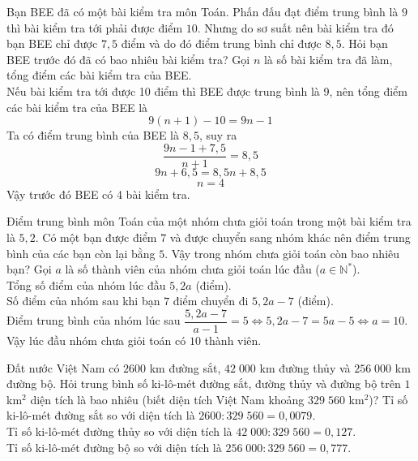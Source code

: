 \begin{bt}%
	Bạn BEE đã có một bài kiểm tra môn Toán. Phấn đấu đạt điểm trung bình là $ 9 $ thì bài kiểm tra tới phải được điểm $ 10 $. Nhưng do sơ suất nên bài kiểm tra đó bạn BEE chỉ được $ 7{,}5 $ điểm và do đó điểm trung bình chỉ được $ 8{,}5 $. Hỏi bạn BEE trước đó đã có bao nhiêu bài kiểm tra?
	\loigiai
	{
		Gọi $ n $ là số bài kiểm tra đã làm, tổng điểm các bài kiểm tra của BEE.\\
		Nếu bài kiểm tra tới được 10 điểm thì BEE được trung bình là 9, nên tổng điểm các bài kiểm tra của BEE là $$  9(n+1)-10 = 9n -1 $$
		Ta có điểm trung bình của BEE là $ 8{,}5 $, suy ra $$ \dfrac{9n-1 + 7{,5}}{n+1} = 8{,}5 $$
		$$ 9n + 6{,}5 = 8{,5}n +8{,}5 $$
		$$ n=4 $$
		Vậy trước đó BEE có 4 bài kiểm tra.}
\end{bt}
\begin{bt}%
	Điểm trung bình môn Toán của một nhóm chưa giỏi toán trong một bài kiểm tra là $ 5{,}2 $. Có một bạn được điểm $ 7 $ và được chuyển sang nhóm khác nên điểm trung bình của các bạn còn lại bằng $ 5 $. Vậy trong nhóm chưa giỏi toán còn bao nhiêu bạn?
	\loigiai
	{ Gọi $ a $ là số thành viên của nhóm chưa giỏi toán lúc đầu ($ a \in \mathbb{N}^* $).\\
		Tổng số điểm của nhóm lúc đầu $ 5{,}2a $ (điểm).\\
		Số điểm của nhóm sau khi bạn $ 7 $ điểm chuyển đi $ 5{,}2a-7 $ (điểm).\\
		Điểm trung bình của nhóm lúc sau $ \dfrac{5{,}2a-7}{a-1}=5 \Leftrightarrow 5{,}2a-7=5a-5 \Leftrightarrow a=10$.\\
		Vậy lúc đầu nhóm chưa giỏi toán có $ 10 $ thành viên.
	}
\end{bt}
\begin{bt}%
	Đất nước Việt Nam có $ 2600 $ km đường sắt, $ 42\;000 $ km đường thủy và $ 256\;000 $ km đường bộ. Hỏi trung bình số ki-lô-mét đường sắt, đường thủy và đường bộ trên $ 1 $ km$ ^2 $ diện tích là bao nhiêu (biết diện tích Việt Nam khoảng $ 329\;560 $ km$ ^2 $)?
	\loigiai
	{ Tỉ số ki-lô-mét đường sắt so với diện tích là $ 2600 : 329\;560 = 0{,}0079$.\\
		Tỉ số ki-lô-mét đường thủy so với diện tích là $  42\;000 : 329\;560 = 0{,}127$.\\
		Tỉ số ki-lô-mét đường bộ so với diện tích là $  256\;000 : 329\;560 = 0{,}777$.
	}
\end{bt}

